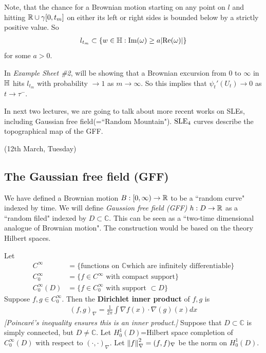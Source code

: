 \documentclass[12pt,a4paper]{article}
\newenvironment{proof}
{\begin{changemargin}{0.5cm}{0.5cm} 
	}%
	{\end{changemargin}
}
\newenvironment{subproof}
{\begin{changemargin}{0.5cm}{0.5cm} 
	}%
	{\end{changemargin}
}
\newenvironment{p}
{\begin{proof} 
	}%
	{\end{proof}
}
\begin{document}
\begin{p}
\begin{subproof}
\quad Note, that the chance for a Brownian motion starting on any point on $l$ and hitting $\mathbb{R} \cup \gamma [0, t_m]$ on either its left or right sides is bounded below by a strictly positive value. So
\begin{align*}
l_{t_m} \subset \{ w\in \mathbb{H} : \text{Im}(\omega) \geq a|\text{Re}(\omega)|\}
\end{align*}
for some $a>0$.

\quad In \emph{Example Sheet \#2}, will be showing that a Brownian excursion from 0 to $\infty$ in $\mathbb{H}$ hits $l_{t_m}$ with probability $\rightarrow 1$ as $m\rightarrow \infty$. So this implies that $\psi_{t}'(U_t) \rightarrow 0$ as $t\rightarrow \tau^-$. 
\end{subproof}
\eop
\end{p}
\s

In next two lectures, we are going to talk about more recent works on SLEs, including Gaussian free field(=``Random Mountain"). $\text{SLE}_{4}$ curves describe the topographical map of the GFF. 
\s

\newday

(12th March, Tuesday)

\subsection*{The Gaussian free field (GFF)}

We have defined a Brownian motion $B: [0, \infty) \rightarrow \mathbb{R}$ to be a ``random curve" indexed by time. We will define \emph{Gaussion free field (GFF)} $h: D\rightarrow \mathbb{R}$ as a ``random filed" indexed by $D\subset \mathbb{C}$. This can be seen as a ``two-time dimensional analogue of Brownian motion". The construction would be based on the theory Hilbert spaces.
\s

 Let
\begin{align*}
C^{\infty} &= \{\text{functions on } \mathbb{C}\text{which are infinitely differentiable}\} \\
C_0^{\infty} &= \{f\in C^{\infty} \text{ with compact support}\} \\
C_0^{\infty}(D) &= \{f\in C_0^{\infty} \text{ with support }\subset D\}
\end{align*}
Suppose $f, g\in C_0^{\infty}$. Then the \textbf{Dirichlet inner product} of $f,g$ is
\begin{align*}
(f,g)_{\nabla} = \frac{1}{2\pi} \int \nabla f (x) \cdot \nabla(g) (x) dx
\end{align*}
\emph{[Poincar\'e's inequality ensures this is an inner product.]} Suppose that $D\subset \mathbb{C}$ is simply connected, but $D\neq \mathbb{C}$. Let $H_0^1(D)$=Hilbert space completion of $C_0^{\infty}(D)$ with respect to $(\cdot, \cdot)_{\nabla}$. Let $\snorms{f}{\nabla}^2 = (f,f)_{\nabla}$ be the norm on $H_0^1(D)$.
\end{document}
